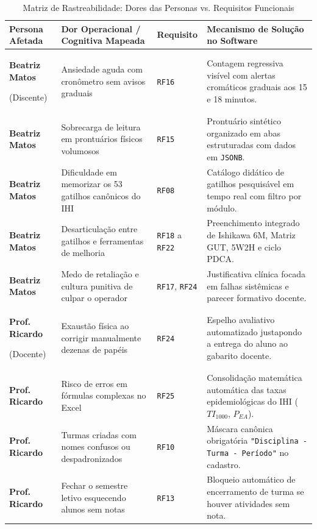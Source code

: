 \begin{table}[!ht]
\centering
\caption{Matriz de Rastreabilidade: Dores das Personas vs. Requisitos Funcionais}
\label{tab_rastreabilidade_dores_rf}
\footnotesize
\begin{tabularx}{\textwidth}{p{2.6cm} p{4.6cm} p{1.6cm} X}
\toprule
\textbf{Persona Afetada} & \textbf{Dor Operacional / Cognitiva Mapeada} & \textbf{Requisito} & \textbf{Mecanismo de Solução no Software} \\
\midrule
\textbf{Beatriz Matos} \par (Discente) & Ansiedade aguda com cronômetro sem avisos graduais & \texttt{RF16} & Contagem regressiva visível com alertas cromáticos graduais aos 15 e 18 minutos. \\
\addlinespace
\textbf{Beatriz Matos} & Sobrecarga de leitura em prontuários físicos volumosos & \texttt{RF15} & Prontuário sintético organizado em abas estruturadas com dados em \texttt{JSONB}. \\
\addlinespace
\textbf{Beatriz Matos} & Dificuldade em memorizar os 53 gatilhos canônicos do IHI & \texttt{RF08} & Catálogo didático de gatilhos pesquisável em tempo real com filtro por módulo. \\
\addlinespace
\textbf{Beatriz Matos} & Desarticulação entre gatilhos e ferramentas de melhoria & \texttt{RF18} a \texttt{RF22} & Preenchimento integrado de Ishikawa 6M, Matriz GUT, 5W2H e ciclo PDCA. \\
\addlinespace
\textbf{Beatriz Matos} & Medo de retaliação e cultura punitiva de culpar o operador & \texttt{RF17}, \texttt{RF24} & Justificativa clínica focada em falhas sistêmicas e parecer formativo docente. \\
\midrule
\textbf{Prof. Ricardo} \par (Docente) & Exaustão física ao corrigir manualmente dezenas de papéis & \texttt{RF24} & Espelho avaliativo automatizado justapondo a entrega do aluno ao gabarito docente. \\
\addlinespace
\textbf{Prof. Ricardo} & Risco de erros em fórmulas complexas no Excel & \texttt{RF25} & Consolidação matemática automática das taxas epidemiológicas do IHI ($TI_{1000}$, $P_{EA}$). \\
\addlinespace
\textbf{Prof. Ricardo} & Turmas criadas com nomes confusos ou despadronizados & \texttt{RF10} & Máscara canônica obrigatória \texttt{"Disciplina - Turma - Período"} no cadastro. \\
\addlinespace
\textbf{Prof. Ricardo} & Fechar o semestre letivo esquecendo alunos sem notas & \texttt{RF13} & Bloqueio automático de encerramento de turma se houver atividades sem nota. \\

\end{tabularx}
\end{table}
